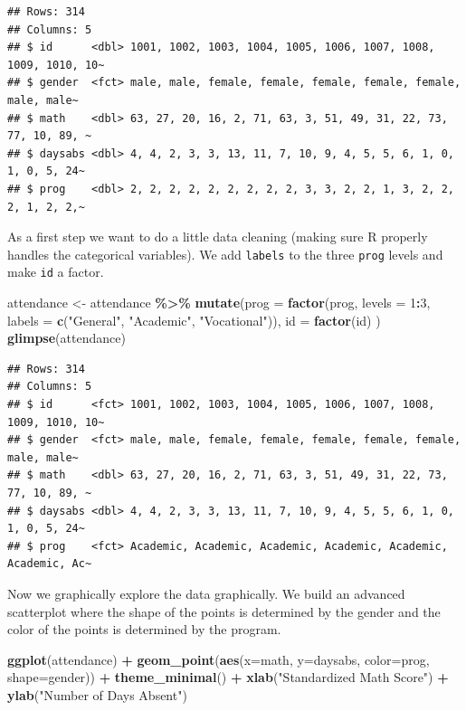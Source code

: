 \documentclass[
]{book}
\newenvironment{Shaded}{\begin{snugshade}}{\end{snugshade}}
\newcommand{\AttributeTok}[1]{\textcolor[rgb]{0.13,0.29,0.53}{#1}}
\newcommand{\DecValTok}[1]{\textcolor[rgb]{0.00,0.00,0.81}{#1}}
\newcommand{\FunctionTok}[1]{\textcolor[rgb]{0.13,0.29,0.53}{\textbf{#1}}}
\newcommand{\NormalTok}[1]{#1}
\newcommand{\OtherTok}[1]{\textcolor[rgb]{0.56,0.35,0.01}{#1}}
\newcommand{\SpecialCharTok}[1]{\textcolor[rgb]{0.81,0.36,0.00}{\textbf{#1}}}
\newcommand{\StringTok}[1]{\textcolor[rgb]{0.31,0.60,0.02}{#1}}
\begin{document}
\begin{verbatim}
## Rows: 314
## Columns: 5
## $ id      <dbl> 1001, 1002, 1003, 1004, 1005, 1006, 1007, 1008, 1009, 1010, 10~
## $ gender  <fct> male, male, female, female, female, female, female, male, male~
## $ math    <dbl> 63, 27, 20, 16, 2, 71, 63, 3, 51, 49, 31, 22, 73, 77, 10, 89, ~
## $ daysabs <dbl> 4, 4, 2, 3, 3, 13, 11, 7, 10, 9, 4, 5, 5, 6, 1, 0, 1, 0, 5, 24~
## $ prog    <dbl> 2, 2, 2, 2, 2, 2, 2, 2, 2, 3, 3, 2, 2, 1, 3, 2, 2, 2, 1, 2, 2,~
\end{verbatim}

As a first step we want to do a little data cleaning (making sure R properly handles the categorical variables). We add \texttt{labels} to the three \texttt{prog} levels and make \texttt{id} a factor.

\begin{Shaded}
\begin{Highlighting}[]
\NormalTok{attendance }\OtherTok{\textless{}{-}}\NormalTok{ attendance }\SpecialCharTok{\%\textgreater{}\%}
  \FunctionTok{mutate}\NormalTok{(}\AttributeTok{prog =} \FunctionTok{factor}\NormalTok{(prog, }\AttributeTok{levels =} \DecValTok{1}\SpecialCharTok{:}\DecValTok{3}\NormalTok{, }
                       \AttributeTok{labels =} \FunctionTok{c}\NormalTok{(}\StringTok{"General"}\NormalTok{, }\StringTok{"Academic"}\NormalTok{, }\StringTok{"Vocational"}\NormalTok{)),}
         \AttributeTok{id =} \FunctionTok{factor}\NormalTok{(id) )}
\FunctionTok{glimpse}\NormalTok{(attendance)}
\end{Highlighting}
\end{Shaded}

\begin{verbatim}
## Rows: 314
## Columns: 5
## $ id      <fct> 1001, 1002, 1003, 1004, 1005, 1006, 1007, 1008, 1009, 1010, 10~
## $ gender  <fct> male, male, female, female, female, female, female, male, male~
## $ math    <dbl> 63, 27, 20, 16, 2, 71, 63, 3, 51, 49, 31, 22, 73, 77, 10, 89, ~
## $ daysabs <dbl> 4, 4, 2, 3, 3, 13, 11, 7, 10, 9, 4, 5, 5, 6, 1, 0, 1, 0, 5, 24~
## $ prog    <fct> Academic, Academic, Academic, Academic, Academic, Academic, Ac~
\end{verbatim}

Now we graphically explore the data graphically. We build an advanced scatterplot where the shape of the points is determined by the gender and the color of the points is determined by the program.

\begin{Shaded}
\begin{Highlighting}[]
\FunctionTok{ggplot}\NormalTok{(attendance) }\SpecialCharTok{+} 
  \FunctionTok{geom\_point}\NormalTok{(}\FunctionTok{aes}\NormalTok{(}\AttributeTok{x=}\NormalTok{math, }\AttributeTok{y=}\NormalTok{daysabs, }\AttributeTok{color=}\NormalTok{prog, }\AttributeTok{shape=}\NormalTok{gender)) }\SpecialCharTok{+} 
  \FunctionTok{theme\_minimal}\NormalTok{() }\SpecialCharTok{+}
  \FunctionTok{xlab}\NormalTok{(}\StringTok{"Standardized Math Score"}\NormalTok{) }\SpecialCharTok{+} \FunctionTok{ylab}\NormalTok{(}\StringTok{"Number of Days Absent"}\NormalTok{)}
\end{Highlighting}
\end{Shaded}
\end{document}
